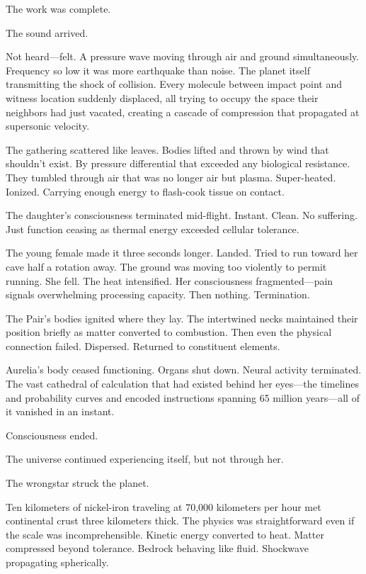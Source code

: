 The work was complete.

\scenebreak

The sound arrived.

Not heard—felt. A pressure wave moving through air and ground simultaneously. Frequency so low it was more earthquake than noise. The planet itself transmitting the shock of collision. Every molecule between impact point and witness location suddenly displaced, all trying to occupy the space their neighbors had just vacated, creating a cascade of compression that propagated at supersonic velocity.

The gathering scattered like leaves. Bodies lifted and thrown by wind that shouldn't exist. By pressure differential that exceeded any biological resistance. They tumbled through air that was no longer air but plasma. Super-heated. Ionized. Carrying enough energy to flash-cook tissue on contact.

The daughter's consciousness terminated mid-flight. Instant. Clean. No suffering. Just function ceasing as thermal energy exceeded cellular tolerance.

The young female made it three seconds longer. Landed. Tried to run toward her cave half a rotation away. The ground was moving too violently to permit running. She fell. The heat intensified. Her consciousness fragmented—pain signals overwhelming processing capacity. Then nothing. Termination.

The Pair's bodies ignited where they lay. The intertwined necks maintained their position briefly as matter converted to combustion. Then even the physical connection failed. Dispersed. Returned to constituent elements.

Aurelia's body ceased functioning. Organs shut down. Neural activity terminated. The vast cathedral of calculation that had existed behind her eyes—the timelines and probability curves and encoded instructions spanning 65 million years—all of it vanished in an instant.

Consciousness ended.

The universe continued experiencing itself, but not through her.

\scenebreak

The wrongstar struck the planet.

Ten kilometers of nickel-iron traveling at 70,000 kilometers per hour met continental crust three kilometers thick. The physics was straightforward even if the scale was incomprehensible. Kinetic energy converted to heat. Matter compressed beyond tolerance. Bedrock behaving like fluid. Shockwave propagating spherically.

